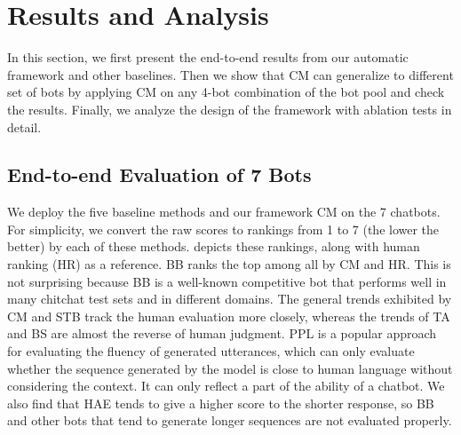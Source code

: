 \section{Results and Analysis}
\label{sec:main}
In this section, we first present the end-to-end results from our automatic framework 
and other baselines.
Then we show that CM can generalize to different set of bots by applying CM on any 4-bot combination
of the bot pool and check the results.
Finally, we analyze the design of the framework with ablation tests in detail.  

\subsection{End-to-end Evaluation of 7 Bots}
We deploy the five baseline methods and our framework CM on the 7 chatbots.
For simplicity, we convert the raw scores to rankings from 1 to 7 (the lower
the better) by
each of these methods.  depicts these rankings,
along with human ranking (HR) as a reference.
BB ranks the top among all by CM and HR. 
This is not surprising because BB is a well-known competitive bot 
that performs well in many chitchat test sets and in different domains. 
The general trends exhibited by CM and STB track the human 
evaluation more
closely, whereas the trends of TA and BS are almost the reverse of human judgment.  
PPL is a popular approach for evaluating the
fluency of generated utterances, 
which can only evaluate whether 
the sequence generated by the model is 
close to human language without considering the context.
It can only reflect a part of the ability of a chatbot. 
We also find that HAE tends to give a higher score to the shorter response, 
so BB and other bots that tend to generate longer sequences are not evaluated
properly.

